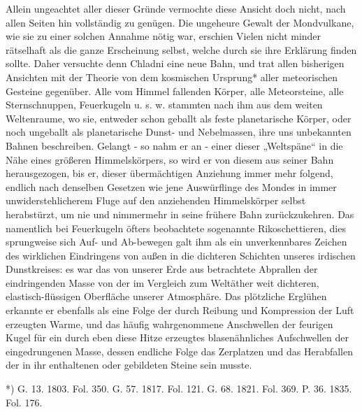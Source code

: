 \documentclass[a4paper, 11pt, oneside, polutonikogreek, german]{article}
\begin{document}
Allein ungeachtet aller dieser Gründe vermochte diese Ansicht doch nicht, nach allen Seiten hin vollständig zu genügen. Die ungeheure Gewalt der Mondvulkane, wie sie zu einer solchen Annahme nötig war, erschien Vielen nicht minder rätselhaft als die ganze Erscheinung selbst, welche durch sie ihre Erklärung finden sollte. Daher versuchte denn Chladni eine neue Bahn, und trat allen bisherigen Ansichten mit der Theorie von dem kosmischen Ursprung* aller meteorischen Gesteine gegenüber. Alle vom Himmel fallenden Körper, alle Meteorsteine, alle Sternschnuppen, Feuerkugeln u. s. w. stammten nach ihm aus dem weiten Weltenraume, wo sie, entweder schon geballt als feste planetarische Körper, oder noch ungeballt als planetarische Dunst- und Nebelmassen, ihre uns unbekannten Bahnen beschreiben. Gelangt - so nahm er an - einer dieser „Weltspäne“ in die Nähe eines größeren Himmelskörpers, so wird er von diesem aus seiner Bahn herausgezogen, bis er, dieser übermächtigen Anziehung immer mehr folgend, endlich nach denselben Gesetzen wie jene Auswürflinge des Mondes in immer unwiderstehlicherem Fluge auf den anziehenden Himmelskörper selbst herabstürzt, um nie und nimmermehr in seine frühere Bahn zurückzukehren. Das namentlich bei Feuerkugeln öfters beobachtete sogenannte Rikoschettieren, dies sprungweise sich Auf- und Ab-bewegen galt ihm als ein unverkennbares Zeichen des wirklichen Eindringens von außen in die dichteren Schichten unseres irdischen Dunstkreises: es war das von unserer Erde aus betrachtete Abprallen der eindringenden Masse von der im Vergleich zum Weltäther weit dichteren, elastisch-flüssigen Oberfläche unserer Atmosphäre. Das plötzliche Erglühen erkannte er ebenfalls als eine Folge der durch Reibung und Kompression der Luft erzeugten Warme, und das häufig wahrgenommene Anschwellen der feurigen Kugel für ein durch eben diese Hitze erzeugtes blasenähnliches Aufschwellen der eingedrungenen Masse, dessen endliche Folge das Zerplatzen und das Herabfallen der in ihr enthaltenen oder gebildeten Steine sein musste.

*) G. 13. 1803. Fol. 350. G. 57. 1817. Fol. 121. G. 68. 1821. Fol. 369. P. 36. 1835. Fol. 176.
\end{document}
